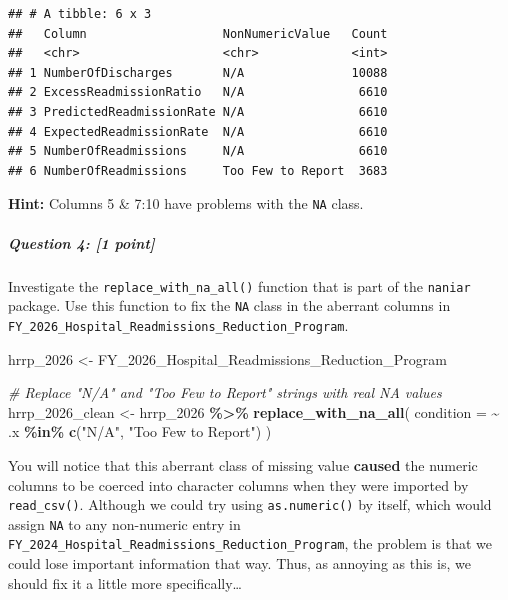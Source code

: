 \documentclass[
]{article}
\newenvironment{Shaded}{\begin{snugshade}}{\end{snugshade}}
\newcommand{\AttributeTok}[1]{\textcolor[rgb]{0.13,0.29,0.53}{#1}}
\newcommand{\CommentTok}[1]{\textcolor[rgb]{0.56,0.35,0.01}{\textit{#1}}}
\newcommand{\FunctionTok}[1]{\textcolor[rgb]{0.13,0.29,0.53}{\textbf{#1}}}
\newcommand{\NormalTok}[1]{#1}
\newcommand{\OtherTok}[1]{\textcolor[rgb]{0.56,0.35,0.01}{#1}}
\newcommand{\SpecialCharTok}[1]{\textcolor[rgb]{0.81,0.36,0.00}{\textbf{#1}}}
\newcommand{\StringTok}[1]{\textcolor[rgb]{0.31,0.60,0.02}{#1}}
\begin{document}
\begin{verbatim}
## # A tibble: 6 x 3
##   Column                   NonNumericValue   Count
##   <chr>                    <chr>             <int>
## 1 NumberOfDischarges       N/A               10088
## 2 ExcessReadmissionRatio   N/A                6610
## 3 PredictedReadmissionRate N/A                6610
## 4 ExpectedReadmissionRate  N/A                6610
## 5 NumberOfReadmissions     N/A                6610
## 6 NumberOfReadmissions     Too Few to Report  3683
\end{verbatim}

\textbf{Hint: }Columns 5 \& 7:10 have problems with the \texttt{NA}
class.

\subparagraph{\texorpdfstring{\textbf{Question 4}: {[}1
point{]}}{Question 4: {[}1 point{]}}}\label{question-4-1-point}

Investigate the \texttt{replace\_with\_na\_all()} function that is part
of the \texttt{naniar} package. Use this function to fix the \texttt{NA}
class in the aberrant columns in
\texttt{FY\_2026\_Hospital\_Readmissions\_Reduction\_Program}.

\begin{Shaded}
\begin{Highlighting}[]
\NormalTok{hrrp\_2026 }\OtherTok{\textless{}{-}}\NormalTok{ FY\_2026\_Hospital\_Readmissions\_Reduction\_Program}

\CommentTok{\# Replace "N/A" and "Too Few to Report" strings with real NA values}
\NormalTok{hrrp\_2026\_clean }\OtherTok{\textless{}{-}}\NormalTok{ hrrp\_2026 }\SpecialCharTok{\%\textgreater{}\%}
    \FunctionTok{replace\_with\_na\_all}\NormalTok{(}
        \AttributeTok{condition =} \SpecialCharTok{\textasciitilde{}}\NormalTok{ .x }\SpecialCharTok{\%in\%} \FunctionTok{c}\NormalTok{(}\StringTok{"N/A"}\NormalTok{, }\StringTok{"Too Few to Report"}\NormalTok{)}
\NormalTok{    )}
\end{Highlighting}
\end{Shaded}

You will notice that this aberrant class of missing value
\textbf{caused} the numeric columns to be coerced into character columns
when they were imported by \texttt{read\_csv()}. Although we could try
using \texttt{as.numeric()} by itself, which would assign \texttt{NA} to
any non-numeric entry in
\texttt{FY\_2024\_Hospital\_Readmissions\_Reduction\_Program}, the
problem is that we could lose important information that way. Thus, as
annoying as this is, we should fix it a little more specifically\ldots{}
\end{document}
